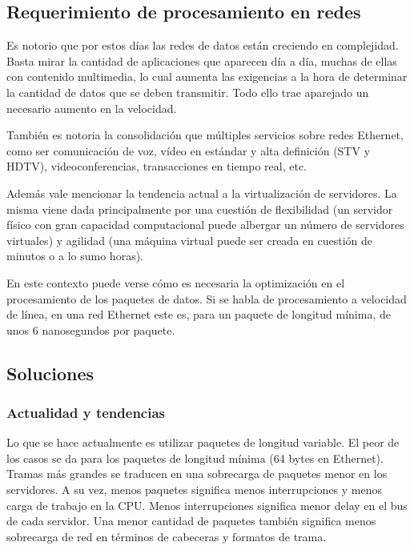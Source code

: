 \subsection{Requerimiento de procesamiento en redes}
Es notorio que por estos días las redes de datos están creciendo en complejidad. Basta mirar la cantidad de aplicaciones que aparecen día a día, muchas de ellas con contenido multimedia, lo cual aumenta las exigencias a la hora de determinar la cantidad de datos que se deben transmitir. Todo ello trae aparejado un necesario aumento en la velocidad. 


También es notoria la consolidación que múltiples servicios sobre redes Ethernet, como ser comunicación de voz, vídeo en estándar y alta definición (STV y HDTV), videoconferencias, transacciones en tiempo real, etc.


Además vale mencionar la tendencia actual a la virtualización de servidores. La misma viene dada principalmente por una cuestión de flexibilidad (un servidor físico con gran capacidad computacional puede albergar un número de servidores virtuales) y agilidad (una máquina virtual puede ser creada en cuestión de minutos o a lo sumo horas).

En este contexto puede verse cómo es necesaria la optimización en el procesamiento de los paquetes de datos. Si se habla de procesamiento a velocidad de línea, en una red Ethernet este es, para un paquete de longitud mínima, de unos 6 nanosegundos por paquete.


\subsection{Soluciones}
\subsubsection{Actualidad y tendencias}
Lo que se hace actualmente es utilizar paquetes de longitud variable. El peor de los casos se da para los paquetes de longitud mínima (64 bytes en Ethernet). Tramas más grandes se traducen en una sobrecarga de paquetes menor en los servidores. A su vez, menos paquetes significa menos interrupciones y menos carga de trabajo en la CPU. Menos interrupciones significa menor delay en el bus de cada servidor. Una menor cantidad de paquetes también significa menos sobrecarga de red en términos de cabeceras y formatos de trama.

